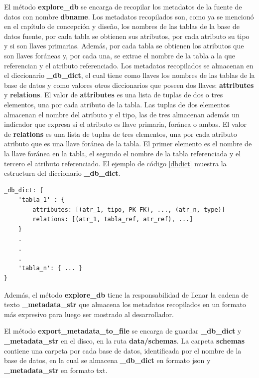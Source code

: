 El método \textbf{explore\_db} se encarga de recopilar los metadatos de la fuente de datos con nombre \textbf{dbname}. 
Los metadatos recopilados son, como ya se mencion\'o en el cap\'itulo de concepción y diseño, los nombres de las 
tablas de la base de datos fuente, por cada tabla se obtienen sus
atributos, por cada atributo su tipo y si son llaves primarias. Además, por cada tabla
se obtienen los atributos que son llaves foráneas y, por cada una, se extrae el nombre
de la tabla a la que referencian y el atributo referenciado. Los metadatos recopilados se almacenan en el diccionario 
\textbf{\_db\_dict}, el cual tiene como llaves los nombres de las tablas de la base 
de datos y como valores otros diccionarios que poseen dos llaves: \textbf{attributes} y \textbf{relations}. 
El valor de \textbf{attributes} es una lista de tuplas de dos o tres elementos, una por cada atributo de la tabla. 
Las tuplas de dos elementos almacenan el nombre del atributo y el tipo, las de tres almacenan además un indicador 
que expresa si el atributo es llave primaria, for\'anea o ambas. El valor de \textbf{relations} es una lista de 
tuplas de tres elementos, una por cada atributo atributo que es una llave foránea de la tabla. El primer elemento es el nombre 
de la llave for\'anea en la tabla, el segundo el nombre de la tabla referenciada y el tercero el atributo referenciado. 
El ejemplo de c\'odigo \ref{dbdict} muestra la estructura del diccionario \textbf{\_db\_dict}. 

\begin{lstlisting}[label={dbdict}, caption={Estructura del diccionario \textbf{\_db\_dict}}]
_db_dict: {
    'tabla_1' : {
        attributes: [(atr_1, tipo, PK FK), ..., (atr_n, type)]
        relations: [(atr_1, tabla_ref, atr_ref), ...]
    }
    .
    .
    .
    'tabla_n': { ... }
}
\end{lstlisting}

Además, el método \textbf{explore\_db} tiene la responsabilidad de llenar la cadena de texto \textbf{\_metadata\_str} 
que almacena los metadatos recopilados en un formato m\'as expresivo para luego ser mostrado al desarrollador.

El método \textbf{export\_metadata\_to\_file} se encarga de guardar \textbf{\_db\_dict} y \textbf{\_metadata\_str} en el disco, 
en la ruta \textbf{data/schemas}. La carpeta \textbf{schemas} contiene una carpeta por cada base de datos, identificada 
por el nombre de la base de datos, en la cual se almacena \textbf{\_db\_dict} en formato json y 
\textbf{\_metadata\_str} en formato txt.

